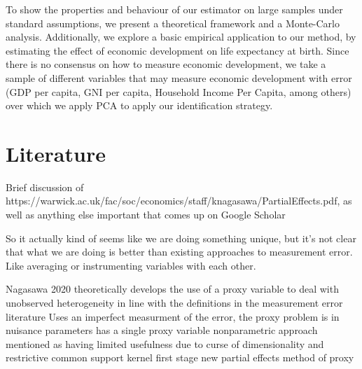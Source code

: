 \documentclass[12pt]{article}
\begin{document}
        To show the properties and behaviour of our estimator on large samples under standard assumptions, we present a theoretical framework and a Monte-Carlo analysis. Additionally, we explore a basic empirical application to our method, by estimating the effect of economic development on life expectancy at birth. Since there is no consensus on how to measure economic development, we take a sample of different variables that may measure economic development with error (GDP per capita, GNI per capita, Household Income Per Capita, among others) over which we apply PCA to apply our identification strategy.

    \section*{Literature}

        Brief discussion of https://warwick.ac.uk/fac/soc/economics/staff/knagasawa/PartialEffects.pdf, as well as anything else important that comes up on Google Scholar

        So it actually kind of seems like we are doing something unique, but it's not clear that what we are doing is better than existing approaches to measurement error. Like averaging or instrumenting variables with each other.

        Nagasawa 2020 
        theoretically develops the use of a proxy variable to deal with unobserved heterogeneity in line with the definitions in the measurement error literature
        Uses an imperfect measurment of the error, the proxy
        problem is in nuisance parameters
        has a single proxy variable
        nonparametric approach mentioned as having limited usefulness due to curse of dimensionality and restrictive common support
        kernel first stage
        new partial effects method of proxy
\end{document}
